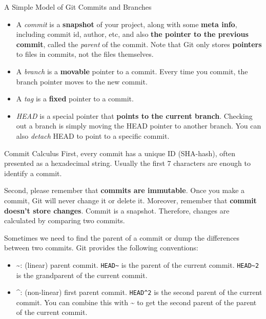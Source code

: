 \documentclass[aspectratio=169]{beamer}
\begin{document}
\begin{frame}{A Simple Model of Git Commits and Branches}
    \begin{itemize}[<+->]
        \item A \emph{commit} is a \textbf{snapshot} of your project, along with some \textbf{meta info}, including commit id, author, etc, and also \textbf{the pointer to the previous commit}, called the \emph{parent} of the commit. Note that Git only stores \textbf{pointers} to files in commits, not the files themselves.
        \item A \emph{branch} is a \textbf{movable} pointer to a commit. Every time you commit, the branch pointer moves to the new commit.
        \item A \emph{tag} is a \textbf{fixed} pointer to a commit.
        \item \emph{HEAD} is a special pointer that \textbf{points to the current branch}. Checking out a branch is simply moving the HEAD pointer to another branch. You can also \emph{detach} HEAD to point to a specific commit.
    \end{itemize}
\end{frame}

\begin{frame}{Commit Calculus}
    First, every commit has a unique ID (SHA-hash), often presented as a hexadecimal string. Usually the first 7 characters are enough to identify a commit.

    \smallskip
    \pause

    Second, please remember that \textbf{commits are immutable}. Once you make a commit, Git will never change it or delete it. Moreover, remember that \textbf{commit doesn't store changes}. Commit is a snapshot. Therefore, changes are calculated by comparing two commits.

    \smallskip
    \pause

    Sometimes we need to find the parent of a commit or dump the differences between two commits. Git provides the following conventions:
    \begin{itemize}
        \item \~{}: (linear) parent commit. \texttt{HEAD\~{}} is the parent of the current commit. \texttt{HEAD\~{}2} is the grandparent of the current commit.
        \item \^{}: (non-linear) first parent commit. \texttt{HEAD\^{}2} is the second parent of the current commit. You can combine this with \~{} to get the second parent of the parent of the current commit.
    \end{itemize}
\end{frame}
\end{document}
